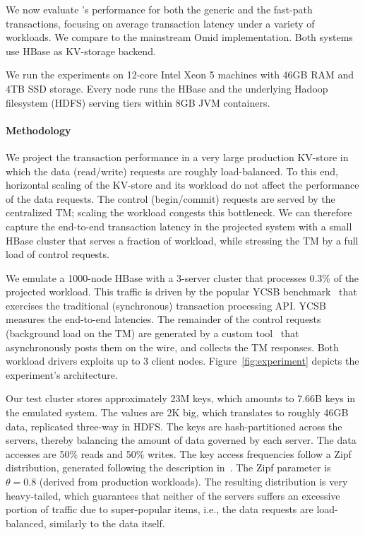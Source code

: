 We now evaluate {\sys}'s performance for both the generic and the fast-path transactions, 
focusing on average transaction latency under a variety of workloads. We compare {\sys\/} 
to the mainstream Omid implementation. Both systems use HBase as KV-storage backend.

We run the experiments on 12-core Intel Xeon 5 machines with 46GB RAM and 4TB 
SSD storage. Every node runs the HBase and the underlying Hadoop filesystem (HDFS) 
serving tiers within 8GB JVM containers. 

\paragraph{Methodology}
We project the transaction performance in a very large production KV-store in which the data (read/write) 
requests are roughly load-balanced. To this end, horizontal scaling of the KV-store and its workload do not 
affect the performance of the data requests. The control (begin/commit) requests are served by the centralized 
TM; scaling the workload congests this bottleneck. We can therefore capture the end-to-end transaction latency
in the projected system with a small HBase cluster that serves a fraction of workload, while stressing the TM 
by a full load of control requests. 

We emulate a 1000-node HBase with a 3-server cluster that processes $0.3\%$ of the projected workload. 
This traffic is driven by the popular YCSB benchmark~\cite{Cooper:2010:BCS:1807128.1807152} 
that exercises the traditional (synchronous) transaction processing API. YCSB measures the end-to-end latencies.
The remainder of the control requests (background load on the TM) are generated by a custom tool~\cite{Omid2017} 
that asynchronously posts them on the wire, and collects the TM responses. Both workload
drivers exploits up to 3 client nodes. Figure~\ref{fig:experiment} depicts the experiment's architecture. 

Our test cluster stores approximately 23M keys, which amounts to 7.66B keys in the emulated system. 
The values are 2K big, which translates to roughly 46GB data, replicated three-way in HDFS. The keys are hash-partitioned
across the servers, thereby balancing the amount of data governed by each server. The data accesses are 50\% reads and 
50\% writes. The key access frequencies follow a Zipf distribution, generated following the description in~\cite{Gray:1994:QGB:191839.191886}. 
The Zipf parameter is $\theta=0.8$ (derived from production workloads). The resulting distribution is very heavy-tailed, which 
guarantees that neither of the servers suffers an excessive portion of traffic due to super-popular items, i.e., the 
data requests are load-balanced, similarly to the data itself.  

